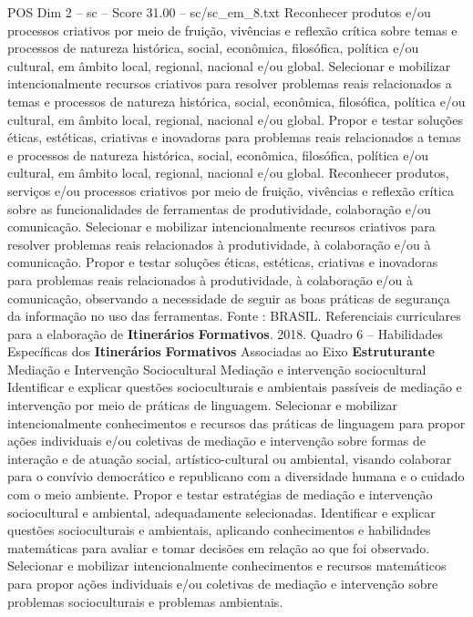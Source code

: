 \begin{textsample}{POS Dim 2 – sc – Score 31.00 – sc/sc\_em\_8.txt}
Reconhecer produtos e/ou processos criativos por meio de fruição, vivências e reflexão crítica sobre temas e processos de natureza histórica, social, econômica, filosófica, política e/ou cultural, em âmbito local, regional, nacional e/ou global.
Selecionar e mobilizar intencionalmente recursos criativos para resolver problemas reais relacionados a temas e processos de natureza histórica, social, econômica, filosófica, política e/ou cultural, em âmbito local, regional, nacional e/ou global.
Propor e testar soluções éticas, estéticas, criativas e inovadoras para problemas reais relacionados a temas e processos de natureza histórica, social, econômica, filosófica, política e/ou cultural, em âmbito local, regional, nacional e/ou global.
Reconhecer produtos, serviços e/ou processos criativos por meio de fruição, vivências e reflexão crítica sobre as funcionalidades de ferramentas de produtividade, colaboração e/ou comunicação.
Selecionar e mobilizar intencionalmente recursos criativos para resolver problemas reais relacionados à produtividade, à colaboração e/ou à comunicação.
Propor e testar soluções éticas, estéticas, criativas e inovadoras para problemas reais relacionados à produtividade, à colaboração e/ou à comunicação, observando a necessidade de seguir as boas práticas de segurança da informação no uso das ferramentas.
Fonte : BRASIL.
Referenciais curriculares para a elaboração de \textbf{Itinerários} \textbf{Formativos}. 2018.
Quadro 6 – Habilidades Específicas dos \textbf{Itinerários} \textbf{Formativos} Associadas ao Eixo \textbf{Estruturante} Mediação e Intervenção Sociocultural Mediação e intervenção sociocultural Identificar e explicar questões socioculturais e ambientais passíveis de mediação e intervenção por meio de práticas de linguagem.
Selecionar e mobilizar intencionalmente conhecimentos e recursos das práticas de linguagem para propor ações individuais e/ou coletivas de mediação e intervenção sobre formas de interação e de atuação social, artístico-cultural ou ambiental, visando colaborar para o convívio democrático e republicano com a diversidade humana e o cuidado com o meio ambiente.
Propor e testar estratégias de mediação e intervenção sociocultural e ambiental, adequadamente selecionadas.
Identificar e explicar questões socioculturais e ambientais, aplicando conhecimentos e habilidades matemáticas para avaliar e tomar decisões em relação ao que foi observado.
Selecionar e mobilizar intencionalmente conhecimentos e recursos matemáticos para propor ações individuais e/ou coletivas de mediação e intervenção sobre problemas socioculturais e problemas ambientais.

\end{textsample}
